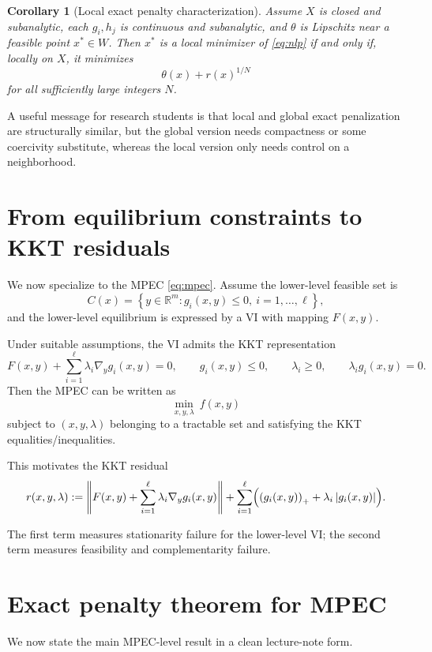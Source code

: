 \documentclass[pdflatex,sn-mathphys-num]{sn-jnl}%
\newtheorem{corollary}[theorem]{Corollary}
\theoremstyle{definition}
\newcommand{\R}{\mathbb{R}}
\newcommand{\norm}[1]{\left\lVert #1 \right\rVert}
\newcommand{\abs}[1]{\left\lvert #1 \right\rvert}
\newcommand{\set}[1]{\left\{ #1 \right\}}
\newcommand{\pos}[1]{\left(#1\right)_{+}}
\begin{document}
\begin{corollary}[Local exact penalty characterization]
\label{cor:local}
Assume $X$ is closed and subanalytic, each $g_i,h_j$ is continuous and subanalytic, and $\theta$ is Lipschitz near a feasible point $x^\ast\in W$. Then $x^\ast$ is a local minimizer of \eqref{eq:nlp} if and only if, locally on $X$, it minimizes
\[
\theta(x)+r(x)^{1/N}
\]
for all sufficiently large integers $N$.
\end{corollary}

A useful message for research students is that local and global exact penalization are structurally similar, but the global version needs compactness or some coercivity substitute, whereas the local version only needs control on a neighborhood.

\section{From equilibrium constraints to KKT residuals}

We now specialize to the MPEC \eqref{eq:mpec}. Assume the lower-level feasible set is
\[
C(x)=\set{y\in\R^m : g_i(x,y)\le 0,\ i=1,\dots,\ell},
\]
and the lower-level equilibrium is expressed by a VI with mapping $F(x,y)$.

Under suitable assumptions, the VI admits the KKT representation
\[
F(x,y)+\sum_{i=1}^\ell \lambda_i \nabla_y g_i(x,y)=0,\qquad
g_i(x,y)\le 0,\qquad
\lambda_i\ge 0,\qquad
\lambda_i g_i(x,y)=0.
\]
Then the MPEC can be written as
\[
\min_{x,y,\lambda}\ f(x,y)
\]
subject to $(x,y,\lambda)$ belonging to a tractable set and satisfying the KKT equalities/inequalities.

This motivates the KKT residual
\begin{equation}
\label{eq:mpec-residual}
r(x,y,\lambda):=
\norm{F(x,y)+\sum_{i=1}^{\ell}\lambda_i \nabla_y g_i(x,y)}
+\sum_{i=1}^{\ell}\Bigl(\pos{g_i(x,y)}+\lambda_i\abs{g_i(x,y)}\Bigr).
\end{equation}

The first term measures stationarity failure for the lower-level VI; the second term measures feasibility and complementarity failure.

\section{Exact penalty theorem for MPEC}

We now state the main MPEC-level result in a clean lecture-note form.
\end{document}

